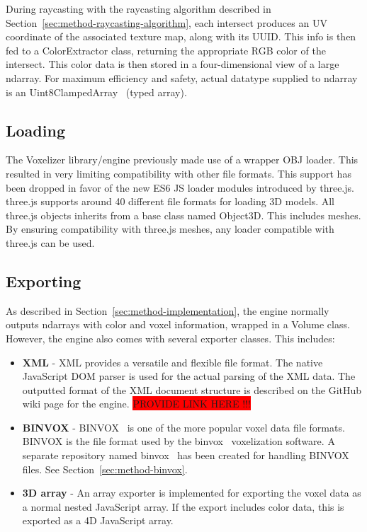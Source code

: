 During raycasting with the raycasting algorithm described in Section~\ref{sec:method-raycasting-algorithm}, each intersect produces an UV coordinate of the associated texture map, along with its UUID. This info is then fed to a ColorExtractor class, returning the appropriate RGB color of the intersect. This color data is then stored in a four-dimensional view of a large ndarray. For maximum efficiency and safety, actual datatype supplied to ndarray is an Uint8ClampedArray~\cite{uint8clampedarray} (typed array).

\subsection{Loading}
The Voxelizer library/engine previously made use of a wrapper OBJ loader. This resulted in very limiting compatibility with other file formats. This support has been dropped in favor of the new ES6 JS loader modules introduced by three.js. three.js supports around 40 different file formats for loading 3D models. All three.js objects inherits from a base class named Object3D. This includes meshes. By ensuring compatibility with three.js meshes, any loader compatible with three.js can be used.

\subsection{Exporting}
As described in Section~\ref{sec:method-implementation}, the engine normally outputs ndarrays with color and voxel information, wrapped in a Volume class. However, the engine also comes with several exporter classes. This includes:
\begin{itemize}
    \item \textbf{XML} - XML provides a versatile and flexible file format. The native JavaScript DOM parser is used for the actual parsing of the XML data. The outputted format of the XML document structure is described on the GitHub wiki page for the engine.
    \colorbox{red}{PROVIDE LINK HERE !!!}
    \item \textbf{BINVOX} - BINVOX~\cite{binvox-file-format} is one of the more popular voxel data file formats. BINVOX is the file format used by the binvox~\cite{binvox} voxelization software. A separate repository named binvox~\cite{andstor-binvox} has been created for handling BINVOX files. See Section~\ref{sec:method-binvox}.
    \item \textbf{3D array} - An array exporter is implemented for exporting the voxel data as a normal nested JavaScript array. If the export includes color data, this is exported as a 4D JavaScript array.
\end{itemize}

